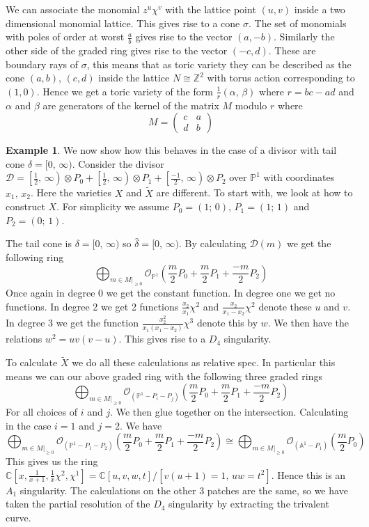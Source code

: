 \documentclass[12pt,a4paper]{book}      %
\theoremstyle{definition}
\newtheorem{ex}[thm]{Example}
\newcommand{\mb}[1]{\mathbb{#1}}
\begin{document}
We can associate the monomial $z^u \chi^v$ with the lattice point $(u,v)$ inside a two dimensional monomial lattice. This gives rise to a cone $\sigma$. The set of monomials with poles of order at worst $\frac{a}{b}$ gives rise to the vector $(a, -b)$. Similarly the other side of the graded ring gives rise to the vector $(-c, d)$. These are boundary rays of $\sigma$, this means that as toric variety they can be described as the cone $(a,b)$, $(c,d)$ inside the lattice $N \cong \mathbb{Z}^2$ with torus action corresponding to $(1,0)$.  Hence we get a toric variety of the form $\frac{1}{r}(\alpha, \, \beta)$ where $r = bc-ad$ and $\alpha$ and $\beta$ are generators of the kernel of the matrix $M$ modulo $r$ where
\[
M =  \begin{pmatrix} c & a \\ d & b \end{pmatrix} 
\]



\begin{ex}\rm
We now show how this behaves in the case of a divisor with tail cone $\delta = [0, \, \infty)$. Consider the divisor $\mathcal{D} = \left[\frac{1}{2}, \, \infty \right) \otimes P_0 + \left[\frac{1}{2}, \, \infty \right) \otimes P_1 + \left[\frac{-1}{2}, \, \infty \right) \otimes P_2$ over $\mb{P}^1$ with coordinates $x_1, \, x_2$. Here the varieties $X$ and $\widetilde{X}$ are different. To start with, we look at how to construct $X$. For simplicity we assume $P_0 = (1; \, 0)$, $P_1 = (1; \, 1)$ and $P_2 = (0; \, 1)$.

The tail cone is $\delta = [0, \, \infty)$ so $\hat\delta = [0, \, \infty)$. By calculating $\mathcal{D}(m)$ we get the following ring
\[
\bigoplus_{m \in M|_{\geq 0}} \mathcal{O}_{\mb{P}^1} \left( \frac{m}{2} P_0 + \frac{m}{2} P_1 + \frac{-m}{2} P_2 \right)
\]
Once again in degree 0 we get the constant function. In degree one we get no functions. In degree 2 we get 2 functions $\frac{x_2}{x_1} \chi^2 $ and $\frac{x_2}{x_1-x_2} \chi^2$ denote these $u$ and $v$. In degree 3 we get the function $\frac{x_2^2}{x_1(x_1-x_2)} \chi^3 $ denote this by $w$. We then have the relations $w^2 = uv(v-u)$. This gives rise to a $D_4$ singularity.  

To calculate $\widetilde{X}$ we do all these calculations as relative spec. In particular this means we can our above graded ring with the following three graded rings
\[
\bigoplus_{m \in M|_{\geq 0}} \mathcal{O}_{(\mb{P}^1 - P_i - P_j)} \left( \frac{m}{2} P_0 + \frac{m}{2} P_1 + \frac{-m}{2} P_2 \right)
\]
For all choices of $i$ and $j$. We then glue together on the intersection. Calculating in the case $i=1$ and $j =2$. We have
\[
\bigoplus_{m \in M|_{\geq 0}} \mathcal{O}_{(\mb{P}^1 - P_1 - P_2)} \left( \frac{m}{2} P_0 + \frac{m}{2} P_1 + \frac{-m}{2} P_2 \right) \cong \bigoplus_{m \in M|_{\geq 0}} \mathcal{O}_{(\mb{A}^1 - P_1)} (\frac{m}{2}P_0)
\]
This gives us the ring $\mb{C}[x, \frac{1}{x+1}, \frac{1}{x}\chi^2, \chi^1] = \mb{C}[u,v,w,t]/[v(u+1) = 1, \, uw = t^2]$. Hence this is an $A_1$ singularity. The calculations on the other 3 patches are the same, so we have taken the partial resolution of the $D_4$ singularity by extracting the trivalent curve. 
\end{ex}
\end{document}
